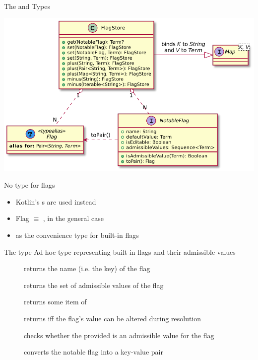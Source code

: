 \documentclass[handout]{beamer}
\begin{document}
\begin{frame}[allowframebreaks]{The  and  Types}
    \begin{center}
        \includegraphics[width=.8\linewidth]{img/flags.pdf}
    \end{center}

    \begin{alertblock}{No type for flags}
        \begin{itemize}
            \item Kotlin's s are used instead
            \item Flag $\equiv$ , in the general case
            \item {} as the convenience type for \alert{built-in} flags
        \end{itemize}
    \end{alertblock}

    \framebreak

    \begin{block}{The  type}\centering
        Ad-hoc type representing \alert{built-in} flags and their admissible values
    \end{block}
    \begin{description}
        \item[] returns the name (i.e. the key) of the flag
        \item[] returns the set of admissible values of the flag
        \item[] returns some item of 
        \item[] returns  iff the flag's value can be altered during resolution
        \item[] checks whether the provided  is an admissible value for the flag
        \item[] converts the notable flag into a key-value pair
    \end{description}


\end{frame}
\end{document}
